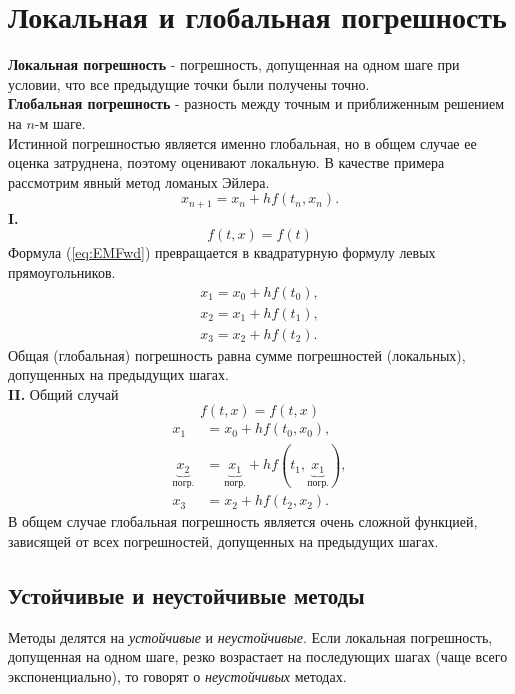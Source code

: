 \documentclass[a4paper,11pt]{article}
\begin{document}
\section{Локальная и глобальная погрешность}
\textbf{Локальная погрешность} - погрешность, допущенная на одном шаге при условии, что все предыдущие точки были получены точно. \\
\textbf{Глобальная погрешность} - разность между точным и приближенным решением на $n$-м шаге. \\

\noindent Истинной погрешностью является именно глобальная, но в общем случае ее оценка затруднена, поэтому оценивают локальную.
В качестве примера рассмотрим явный метод ломаных Эйлера.
\begin{equation}
  x_{n+1} = x_n + hf(t_n, x_n).
  \label{eq:EMFwd}
\end{equation}
\textbf{I.}
\[f(t, x) = f(t)\]
Формула (\ref{eq:EMFwd}) превращается в квадратурную формулу левых прямоугольников.
\begin{gather*}
  x_1 = x_0 + hf(t_0), \\
  x_2 = x_1 + hf(t_1), \\
  x_3 = x_2 + hf(t_2).
\end{gather*}
Общая (глобальная) погрешность равна сумме погрешностей (локальных), допущенных на предыдущих шагах. \\
\textbf{II.} Общий случай
\[f(t, x) = f(t, x)\]
\begin{align*}
  x_1 &= x_0 + hf(t_0, x_0), \\
  \underbrace{x_2}_{\text{погр.}} &= \underbrace{x_1}_{\text{погр.}} + hf(t_1, \underbrace{x_1}_{\text{погр.}}), \\
  x_3 &= x_2 + hf(t_2, x_2).
\end{align*}
В общем случае глобальная погрешность является очень сложной функцией, зависящей от всех погрешностей, допущенных на предыдущих шагах.

  \subsection{Устойчивые и неустойчивые методы}
  Методы делятся на \textit{устойчивые} и \textit{неустойчивые}. Если локальная погрешность, допущенная на одном шаге, резко возрастает на последующих шагах (чаще всего экспоненциально),
    то говорят о \textit{неустойчивых} методах. \\
\end{document}
